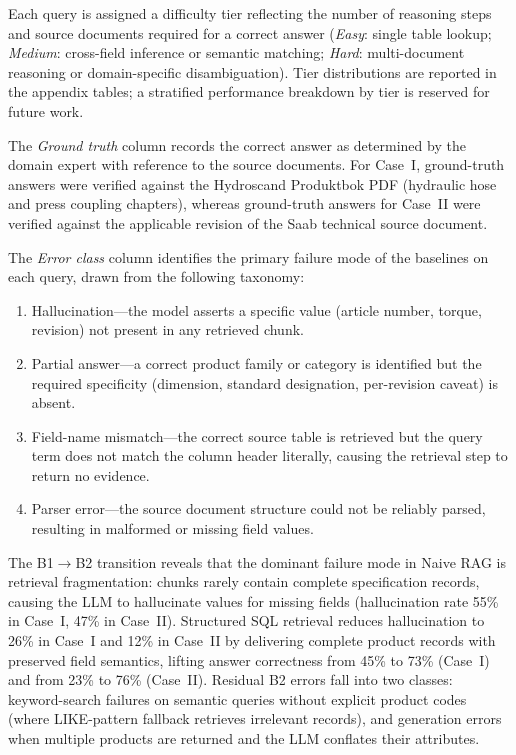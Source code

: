 \documentclass[largeformat]{interact}
\begin{document}
Each query is assigned a difficulty tier reflecting the number of reasoning steps and source documents required for a correct answer (\emph{Easy}: single table lookup; \emph{Medium}: cross-field inference or semantic matching; \emph{Hard}: multi-document reasoning or domain-specific disambiguation). Tier distributions are reported in the appendix tables; a stratified performance breakdown by tier is reserved for future work.

The \emph{Ground truth} column records the correct answer as determined by the domain expert with reference to the source documents. For Case~I, ground-truth answers were verified against the Hydroscand Produktbok PDF (hydraulic hose and press coupling chapters), whereas ground-truth answers for Case~II were verified against the applicable revision of the Saab technical source document.

The \emph{Error class} column identifies the primary failure mode of the baselines on each query, drawn from the following taxonomy:
\begin{enumerate}[label=\roman*.]
    \item Hallucination---the model asserts a specific value (article number, torque, revision) not present in any retrieved chunk.
    \item Partial answer---a correct product family or category is identified but the required specificity (dimension, standard designation, per-revision caveat) is absent.
    \item Field-name mismatch---the correct source table is retrieved but the query term does not match the column header literally, causing the retrieval step to return no evidence.
    \item Parser error---the source document structure could not be reliably parsed, resulting in malformed or missing field values.
\end{enumerate}

The B1$\rightarrow$B2 transition reveals that the dominant failure mode in Naive RAG is retrieval fragmentation: chunks rarely contain complete specification records, causing the LLM to hallucinate values for missing fields (hallucination rate 55\% in Case~I, 47\% in Case~II). Structured SQL retrieval reduces hallucination to 26\% in Case~I and 12\% in Case~II by delivering complete product records with preserved field semantics, lifting answer correctness from 45\% to 73\% (Case~I) and from 23\% to 76\% (Case~II). Residual B2 errors fall into two classes: keyword-search failures on semantic queries without explicit product codes (where LIKE-pattern fallback retrieves irrelevant records), and generation errors when multiple products are returned and the LLM conflates their attributes.
\end{document}
